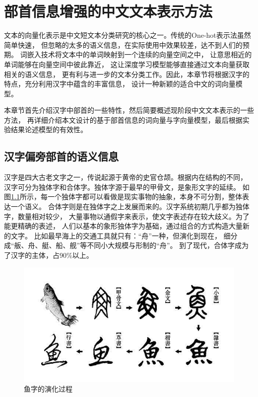 \chapter{部首信息增强的中文文本表示方法}
\label{3_section}
文本的向量化表示是中文短文本分类研究的核心之一。传统的One-hot表示法虽然简单快速，
但忽略的太多的语义信息，在实际使用中效果较差，达不到人们的预期。
词嵌入技术将文本中的单词映射到一个连续的向量空间之中，
让意思相近的单词能够在向量空间中彼此靠近，
这让深度学习模型能够直接通过文本向量获取相关的语义信息，
更有利与进一步的文本分类工作。因此，本章节将根据汉字的特点，充分利用汉字中蕴含的丰富信息，
设计一种新颖的适合中文的词向量模型。

本章节首先介绍汉字中部首的一些特性，然后简要概述现阶段中文文本表示的一些方法，
再详细介绍本文设计的基于部首信息的词向量与字向量模型，最后根据实验结果论述模型的有效性。
\section{汉字偏旁部首的语义信息}
\label{radical_information}
汉字是四大古老文字之一，传说起源于黄帝的史官仓颉。根据内在结构的不同，
汉字可分为独体字和合体字。独体字源于最早的甲骨文，是象形文字的延续。
如图\ref{char_fish}所示，每一个独体字都可以看做是现实事物的抽象，本身不可分割，整体表达一个语义。
合体字则是在独体字之上发展而来的。汉字系统初期几乎都为独体字，数量相对较少，
大量事物以通假字来表示，使文字表述存在较大歧义。为了能更精确的表述，
人们以基本的象形独体字为基础，通过组合的方式构造大量新的文字。
比如最早海上的交通工具就只有：“舟”一种，但演化到现在，
细分成“舨、舟、艇、船、舰”等不同小大规模与形制的“舟”。
到了现代，合体字成为了汉字的主体，占90\%以上。
\begin{figure}[h]
    \includegraphics[scale=0.6]{picture/char.png}
    \caption{鱼字的演化过程}
    \label{char_fish}
\end{figure}


